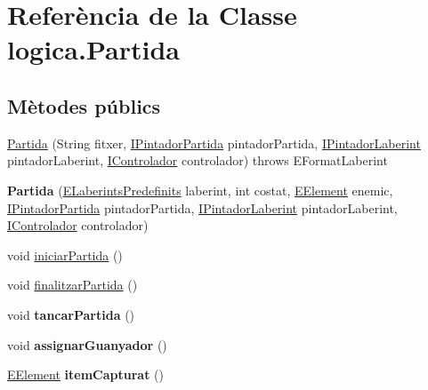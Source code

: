 \hypertarget{classlogica_1_1_partida}{\section{Referència de la Classe logica.\+Partida}
\label{classlogica_1_1_partida}
}
\subsection*{Mètodes públics}
\begin{DoxyCompactItemize}
\item 
\hyperlink{classlogica_1_1_partida_ab85633f290087fe7699fe41008b2e93a}{Partida} (String fitxer, \hyperlink{interfaceinterficie_1_1_i_pintador_partida}{I\+Pintador\+Partida} pintador\+Partida, \hyperlink{interfaceinterficie_1_1_i_pintador_laberint}{I\+Pintador\+Laberint} pintador\+Laberint, \hyperlink{interfacelogica_1_1controladors__pacman_1_1_i_controlador}{I\+Controlador} controlador)  throws E\+Format\+Laberint
\item 
\hypertarget{classlogica_1_1_partida_a89b9872f1db2660c1c0587d48ccef48c}{{\bfseries Partida} (\hyperlink{enumlogica_1_1enumeracions_1_1_e_laberints_predefinits}{E\+Laberints\+Predefinits} laberint, int costat, \hyperlink{enumlogica_1_1enumeracions_1_1_e_element}{E\+Element} enemic, \hyperlink{interfaceinterficie_1_1_i_pintador_partida}{I\+Pintador\+Partida} pintador\+Partida, \hyperlink{interfaceinterficie_1_1_i_pintador_laberint}{I\+Pintador\+Laberint} pintador\+Laberint, \hyperlink{interfacelogica_1_1controladors__pacman_1_1_i_controlador}{I\+Controlador} controlador)}\label{classlogica_1_1_partida_a89b9872f1db2660c1c0587d48ccef48c}

\item 
void \hyperlink{classlogica_1_1_partida_aa23f62dbeea7c44240304843e2ea699d}{iniciar\+Partida} ()
\item 
void \hyperlink{classlogica_1_1_partida_a44c3c25575052f971e90728f15f9c5a2}{finalitzar\+Partida} ()
\item 
\hypertarget{classlogica_1_1_partida_add05723aee1bf8587d0021f96f372c51}{void {\bfseries tancar\+Partida} ()}\label{classlogica_1_1_partida_add05723aee1bf8587d0021f96f372c51}

\item 
\hypertarget{classlogica_1_1_partida_a29bd0292c22c67f4ada328373ec00d05}{void {\bfseries assignar\+Guanyador} ()}\label{classlogica_1_1_partida_a29bd0292c22c67f4ada328373ec00d05}

\item 
\hypertarget{classlogica_1_1_partida_a4f899f5e8cd1e5acc95321331aace206}{\hyperlink{enumlogica_1_1enumeracions_1_1_e_element}{E\+Element} {\bfseries item\+Capturat} ()}\label{classlogica_1_1_partida_a4f899f5e8cd1e5acc95321331aace206}


\end{DoxyCompactItemize}

